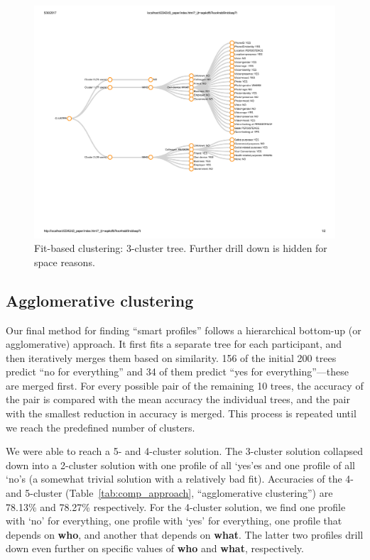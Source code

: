 \begin{figure}
	\centering
	\includegraphics[width=.81\textwidth]{figures/fit-based-3c.pdf}
	\caption{Fit-based clustering: 3-cluster tree. Further drill down is hidden for space reasons.}
	\label{fig:3clustersFit}
\end{figure}

\subsection{Agglomerative clustering}
Our final method for finding ``smart profiles'' follows a hierarchical bottom-up (or agglomerative) approach. It first fits a separate tree for each participant, and then iteratively merges them based on similarity. 156 of the initial 200 trees predict ``no for everything'' and 34 of them predict ``yes for everything''---these are merged first. For every possible pair of the remaining 10 trees, the accuracy of the pair is compared with the mean accuracy the individual trees, and the pair with the smallest reduction in accuracy is merged. This process is repeated until we reach the predefined number of clusters.

We were able to reach a 5- and 4-cluster solution. The 3-cluster solution collapsed down into a 2-cluster solution with one profile of all `yes'es and one profile of all `no's (a somewhat trivial solution with a relatively bad fit). Accuracies of the 4- and 5-cluster (Table~\ref{tab:comp_approach}, ``agglomerative clustering'') are 78.13\% and 78.27\% respectively. For the 4-cluster solution, we find one profile with `no' for everything, one profile with `yes' for everything, one profile that depends on \textbf{who}, and another that depends on \textbf{what}. The latter two profiles drill down even further on specific values of \textbf{who} and \textbf{what}, respectively.



